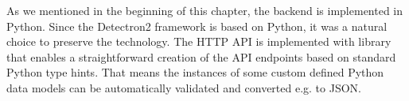 As we mentioned in the beginning of this chapter, the backend is implemented in
Python. Since the Detectron2 framework is based on Python, it was a natural
choice to preserve the technology. The HTTP API is implemented with
 library that enables a straightforward creation of the API
endpoints based on standard Python type hints. That means the instances of some
custom defined Python data models can be automatically validated and converted
e.g. to JSON.